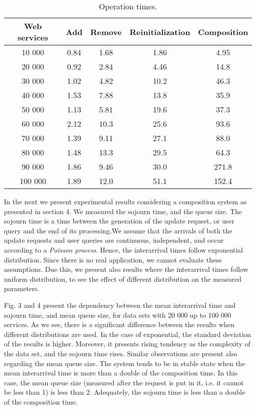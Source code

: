 \documentclass[11pt]{llncs}
\begin{document}
\begin{table}[h!]
  \centering
  \caption{Operation times.}

\begin{tabular}{|c|c|c|c|c|}
\hline  
\textbf{Web services} & \textbf{Add} & \textbf{Remove} & \textbf{Reinitialization} & \textbf{Composition}\\
  \hline  \hline 
  10 000 & 0.84 & 1.68 & 1.86 & 4.95\\
  \hline 
  20 000 & 0.92 & 2.84 & 4.46 & 14.8\\
  \hline 
  30 000 & 1.02 & 4.82 & 10.2 & 46.3\\
  \hline 
  40 000 & 1.53 & 7.88 & 13.8 & 35.9\\
  \hline 
  50 000 & 1.13 & 5.81 & 19.6 & 37.3\\
  \hline 
  60 000 & 2.12 & 10.3 & 25.6 & 93.6\\
  \hline 
  70 000 & 1.39 & 9.11 & 27.1 & 88.0\\
  \hline 
  80 000 & 1.48 & 13.3 & 29.5 & 64.3\\
  \hline 
  90 000 & 1.86 & 9.46 & 30.0 & 271.8\\
  \hline 
  100 000 & 1.89 & 12.0 & 51.1 & 152.4\\ 
  \hline 
\end{tabular}

\end{table}


In the next we present experimental results considering a composition system
as presented in section 4. We measured the sojourn time, and the queue size. The
sojourn time is a time between the generation of the update request, or user query
and the end of its processing.We assume that the arrivals of both the update requests
and user queries are continuous, independent, and occur according to a \emph{Poisson
process}. Hence, the interarrival times follow exponential distribution. Since there is
no real application, we cannot evaluate these assumptions. Due this, we present also
results where the interarrival times follow uniform distribution, to see the effect of
different distribution on the measured parameters.

Fig. 3 and 4 present the dependency between the mean interarrival time and sojourn
time, and mean queue size, for data sets with 20 000 up to 100 000 services.
As we see, there is a significant difference between the results when different distributions
are used. In the case of exponential, the standard deviation of the results
is higher. Moreover, it presents rising tendency as the complexity of the data set,
and the sojourn time rises. Similar observations are present also regarding the mean
queue size. The system tends to be in stable state when the mean interarrival time
is more than a double of the composition time. In this case, the mean queue size
(measured after the request is put in it, i.e. it cannot be less than 1) is less than 2.
Adequately, the sojourn time is less than a double of the composition time.
\end{document}
